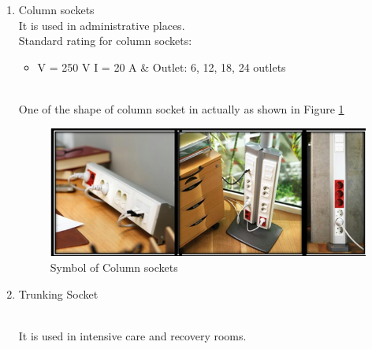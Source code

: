 \documentclass[12pt,fleqn]{book} %
\begin{document}
\begin{enumerate}
    \item Column sockets
    \\ It is used in administrative places.
    \\ Standard rating for column sockets:
    
     \begin{itemize}
        \item  V = 250 V I = 20 A \& Outlet: 6, 12, 18, 24 outlets

\end{itemize}
\\One of the shape of column socket in actually as shown in Figure \ref{fig:s 6}
    \begin{figure}[h!]
    \centering
    \includegraphics[width=0.8\linewidth]{s 6.png}
    \caption{  Symbol of Column sockets}
    \label{fig:s 6}
\end{figure}

    \item Trunking Socket
    
\\ It is used in intensive care and recovery rooms.


\end{enumerate}
\end{document}
